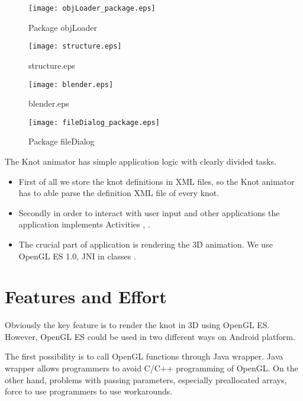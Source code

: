 \begin{figure}
\texttt{[image: objLoader\_package.eps]}
\label{pic:objLoader_package.eps}
\caption{Package objLoader}
\end{figure}

\begin{figure}
\texttt{[image: structure.eps]}
\label{pic:structure.eps}
\caption{structure.eps}
\end{figure}

\begin{figure}
\texttt{[image: blender.eps]}
\label{pic:blender.eps}
\caption{blender.eps}
\end{figure}

\begin{figure}
\texttt{[image: fileDialog\_package.eps]}
\label{pic:fileDialog_package.eps}
\caption{Package fileDialog}
\end{figure}

The Knot animator has simple application logic with clearly divided tasks.
\begin{itemize}
  \item First of all we store the knot definitions in XML files,
so the Knot animator has to able parse the definition XML file of every knot.
  \item Secondly in order to interact with user input and other applications the application 
  implements Activities , .
  \item The crucial part of application is rendering the 3D animation. We use OpenGL ES 1.0,
      JNI in classes  .
\end{itemize}



\section*{Features and Effort} %
\label{sec:Features and Effort}
Obviously the key feature is to render the knot in 3D using OpenGL ES.
However, OpenGL ES could be used in two different ways on Android platform.

The first possibility is to call OpenGL functions through Java wrapper.
Java wrapper allows programmers to avoid C/C++ programming of OpenGL.
On the other hand, problems with passing parameters, especially preallocated arrays,
force to use programmers to use workarounds.

